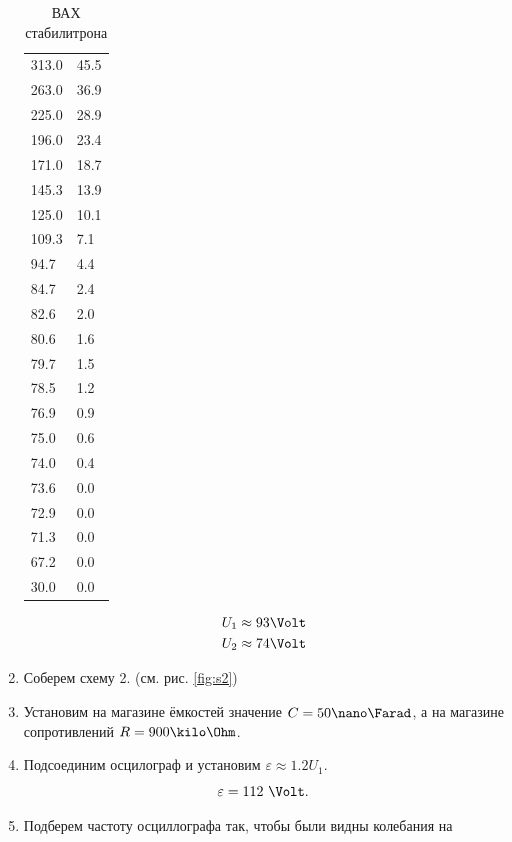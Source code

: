 \documentclass{report}
\begin{document}
\begin{enumerate}
\begin{table}[H]
\begin{tabular}{|l|l|}
			      \hline
			      313.0        & 45.5     \\
			      263.0        & 36.9     \\
			      225.0        & 28.9     \\
			      196.0        & 23.4     \\
			      171.0        & 18.7     \\
			      145.3        & 13.9     \\
			      125.0        & 10.1     \\
			      109.3        & 7.1      \\
			      94.7         & 4.4      \\
			      84.7         & 2.4      \\
			      82.6         & 2.0      \\
			      80.6         & 1.6      \\
			      79.7         & 1.5      \\
			      78.5         & 1.2      \\
			      76.9         & 0.9      \\
			      75.0         & 0.6      \\
			      74.0         & 0.4      \\
			      73.6         & 0.0      \\
			      72.9         & 0.0      \\
			      71.3         & 0.0      \\
			      67.2         & 0.0      \\
			      30.0         & 0.0      \\
			      \hline
		      \end{tabular}
		      \caption{ВАХ стабилитрона}
		      \label{table:1}
	      \end{table}
	      \begin{gather}
		      U_1 \approx 93 \Volt\\
		      U_2 \approx 74 \Volt
	      \end{gather}
	\item Соберем схему 2. (см. рис. \ref{fig:s2})
	\item Установим на магазине ёмкостей значение $C = 50 \nano \Farad$, а на
	      магазине сопротивлений $R = 900 \kilo \Ohm$.
	\item Подсоединим осцилограф и установим $ \varepsilon \approx 1.2 U_1 $.
	      \[
		      \varepsilon = 112\ \Volt
		      .\]
	\item Подберем частоту осциллографа так, чтобы были видны колебания на

\end{enumerate}
\end{document}
